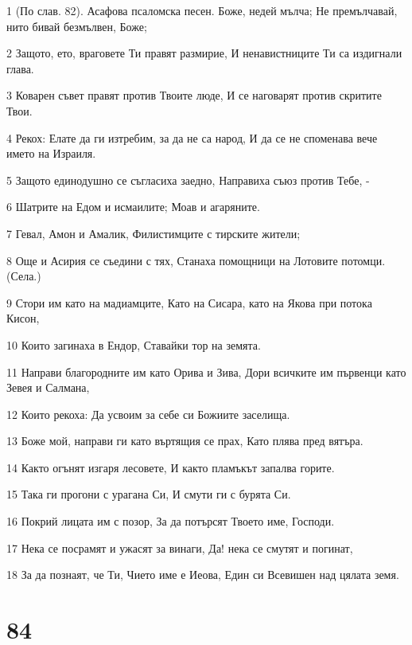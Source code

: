 \par 1 (По слав. 82). Асафова псаломска песен. Боже, недей мълча; Не премълчавай, нито бивай безмълвен, Боже;
\par 2 Защото, ето, враговете Ти правят размирие, И ненавистниците Ти са издигнали глава.
\par 3 Коварен съвет правят против Твоите люде, И се наговарят против скритите Твои.
\par 4 Рекох: Елате да ги изтребим, за да не са народ, И да се не споменава вече името на Израиля.
\par 5 Защото единодушно се съгласиха заедно, Направиха съюз против Тебе, -
\par 6 Шатрите на Едом и исмаилите; Моав и агаряните.
\par 7 Гевал, Амон и Амалик, Филистимците с тирските жители;
\par 8 Още и Асирия се съедини с тях, Станаха помощници на Лотовите потомци. (Села.)
\par 9 Стори им като на мадиамците, Като на Сисара, като на Якова при потока Кисон,
\par 10 Които загинаха в Ендор, Ставайки тор на земята.
\par 11 Направи благородните им като Орива и Зива, Дори всичките им първенци като Зевея и Салмана,
\par 12 Които рекоха: Да усвоим за себе си Божиите заселища.
\par 13 Боже мой, направи ги като въртящия се прах, Като плява пред вятъра.
\par 14 Както огънят изгаря лесовете, И както пламъкът запалва горите.
\par 15 Така ги прогони с урагана Си, И смути ги с бурята Си.
\par 16 Покрий лицата им с позор, За да потърсят Твоето име, Господи.
\par 17 Нека се посрамят и ужасят за винаги, Да! нека се смутят и погинат,
\par 18 За да познаят, че Ти, Чието име е Иеова, Един си Всевишен над цялата земя.

\chapter{84}

